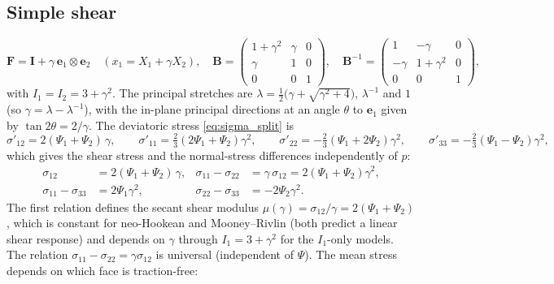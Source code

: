 \documentclass[11pt]{article}
\newcommand{\be}{\bm{e}}
\newcommand{\bF}{\bm{F}}
\newcommand{\bB}{\bm{B}}
\newcommand{\bI}{\bm{I}}
\newcommand{\Ione}{I_1}
\newcommand{\Itwo}{I_2}
\newcommand{\Pone}{\Psi_{1}}
\newcommand{\Ptwo}{\Psi_{2}}
\begin{document}
\subsection{Simple shear}
\begin{equation}
  \bF = \bI + \gamma\,\be_1\otimes\be_2
  \quad (x_1 = X_1 + \gamma X_2), \quad
  \bB = \begin{pmatrix} 1+\gamma^2 & \gamma & 0 \\ \gamma & 1 & 0 \\ 0 & 0 & 1\end{pmatrix}, \quad
  \bB^{-1} = \begin{pmatrix} 1 & -\gamma & 0 \\ -\gamma & 1+\gamma^2 & 0 \\ 0 & 0 & 1\end{pmatrix},
\end{equation}
with $\Ione = \Itwo = 3 + \gamma^2$.  The principal stretches are
$\lambda = \tfrac12\bigl(\gamma + \sqrt{\gamma^2 + 4}\bigr)$, $\lambda^{-1}$ and
$1$ (so $\gamma = \lambda - \lambda^{-1}$), with the in-plane principal
directions at an angle $\theta$ to $\be_1$ given by $\tan 2\theta = 2/\gamma$.
The deviatoric stress \eqref{eq:sigma_split} is
\begin{equation}
  \sigma'_{12} = 2(\Pone + \Ptwo)\,\gamma, \qquad
  \sigma'_{11} = \tfrac23(2\Pone + \Ptwo)\gamma^2, \qquad
  \sigma'_{22} = -\tfrac23(\Pone + 2\Ptwo)\gamma^2, \qquad
  \sigma'_{33} = -\tfrac23(\Pone - \Ptwo)\gamma^2,
\end{equation}
which gives the shear stress and the normal-stress differences
independently of $p$:
\begin{equation}
  \boxed{\;
  \begin{aligned}
  \sigma_{12} &= 2(\Pone + \Ptwo)\,\gamma, &
  \sigma_{11} - \sigma_{22} &= \gamma\,\sigma_{12} = 2(\Pone + \Ptwo)\gamma^2, \\
  \sigma_{11} - \sigma_{33} &= 2\Pone\gamma^2, &
  \sigma_{22} - \sigma_{33} &= -2\Ptwo\gamma^2 .
  \end{aligned}\;}
\end{equation}
The first relation defines the secant shear modulus
$\mu(\gamma) = \sigma_{12}/\gamma = 2(\Pone + \Ptwo)$, which is constant for
neo-Hookean and Mooney--Rivlin (both predict a linear shear response) and
depends on $\gamma$ through $\Ione = 3 + \gamma^2$ for the $\Ione$-only
models.  The relation $\sigma_{11} - \sigma_{22} = \gamma\sigma_{12}$ is
universal (independent of $\Psi$).  The mean stress depends on which face
is traction-free:
\end{document}
